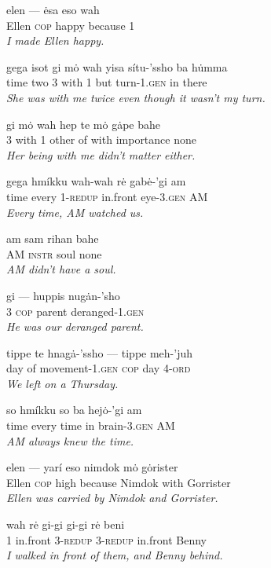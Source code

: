 \documentclass{article}[10pt]
\begin{document}
\begin{exe}
\ex
\gll elen --- \.{e}sa eso wah\\
Ellen \textsc{cop} happy because 1\\
\trans \emph{I made Ellen happy.}

\ex
\gll gega isot gi m\.{o} wah yisa s\'{i}tu-'ssho ba h\.{u}mma\\
time two 3 with 1 but turn-1.\textsc{gen} in there\\
\trans \emph{She was with me twice even though it wasn't my turn.}

\ex
\gll gi m\.{o} wah hep te m\.{o} g\.{a}pe bahe\\
3 with 1 other of with importance none\\
\trans \emph{Her being with me didn't matter either.}

\ex
\gll gega hm\'{i}kku wah-wah r\.{e} gab\.{e}-'gi am\\
time every 1-\textsc{redup} in.front eye-3.\textsc{gen} AM\\
\trans \emph{Every time, AM watched us.}

\ex
\gll am sam rihan bahe\\
AM \textsc{instr} soul none\\
\trans \emph{AM didn't have a soul.}

\ex
\gll gi --- huppis nug\.{a}n-'sho\\
3 \textsc{cop} parent deranged-1.\textsc{gen}\\
\trans \emph{He was our deranged parent.}


\ex
\gll tippe te hnag\.{a}-'ssho --- tippe meh-'juh\\
day of movement-1.\textsc{gen} \textsc{cop} day 4-\textsc{ord}\\
\trans \emph{We left on a Thursday.}

\ex
\gll so hm\'{i}kku so ba hej\.{o}-'gi am\\
time every time in brain-3.\textsc{gen} AM\\
\trans \emph{AM always knew the time.}


\ex
\gll elen --- yar\'{i} eso nimdok m\.{o} g\.{o}rister\\
Ellen \textsc{cop} high because Nimdok with Gorrister\\
\trans \emph{Ellen was carried by Nimdok and Gorrister.}

\ex
\gll wah r\.{e} gi-gi gi-gi r\.{e} beni\\
1 in.front 3-\textsc{redup} 3-\textsc{redup} in.front Benny\\
\trans \emph{I walked in front of them, and Benny behind.}


\end{exe}
\end{document}
